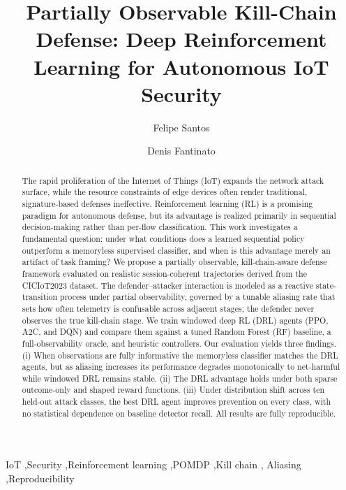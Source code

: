 \documentclass[3p,twocolumn]{elsarticle}
\begin{document}
\begin{frontmatter}

\title{Partially Observable Kill-Chain Defense: Deep Reinforcement
Learning for Autonomous IoT Security}

\author[unicamp]{Felipe Santos}

\author[unicamp]{Denis Fantinato}


\begin{abstract}
The rapid proliferation of the Internet of Things (IoT) expands the network
attack surface, while the resource constraints of edge devices often render
traditional, signature-based defenses ineffective. Reinforcement learning (RL)
is a promising paradigm for autonomous defense, but its advantage is realized
primarily in sequential decision-making rather than per-flow classification.
This work investigates a fundamental question: under what conditions does a
learned sequential policy outperform a memoryless supervised classifier, and
when is this advantage merely an artifact of task framing? We propose a
partially observable, kill-chain-aware defense framework evaluated on realistic
session-coherent trajectories derived from the CICIoT2023 dataset. The
defender--attacker interaction is modeled as a reactive state-transition
process under partial observability, governed by a tunable aliasing rate that
sets how often telemetry is confusable across adjacent stages; the defender
never observes the true kill-chain stage. We train
windowed deep RL (DRL) agents (PPO, A2C, and DQN) and compare them against a
tuned Random Forest (RF) baseline, a full-observability oracle, and heuristic
controllers. Our evaluation yields three findings. (i) When observations are
fully informative the memoryless classifier matches the DRL agents, but as
aliasing increases its performance degrades monotonically to net-harmful while
windowed DRL remains stable. (ii) The DRL advantage holds under both sparse
outcome-only and shaped reward functions. (iii) Under distribution shift across
ten held-out attack classes, the best DRL agent improves prevention on every
class, with no statistical dependence on baseline detector recall. All results
are fully reproducible.
\end{abstract}

\begin{keyword}
IoT \sep Security \sep Reinforcement learning \sep POMDP \sep Kill chain \sep
Aliasing \sep Reproducibility
\end{keyword}

\end{frontmatter}
\end{document}
